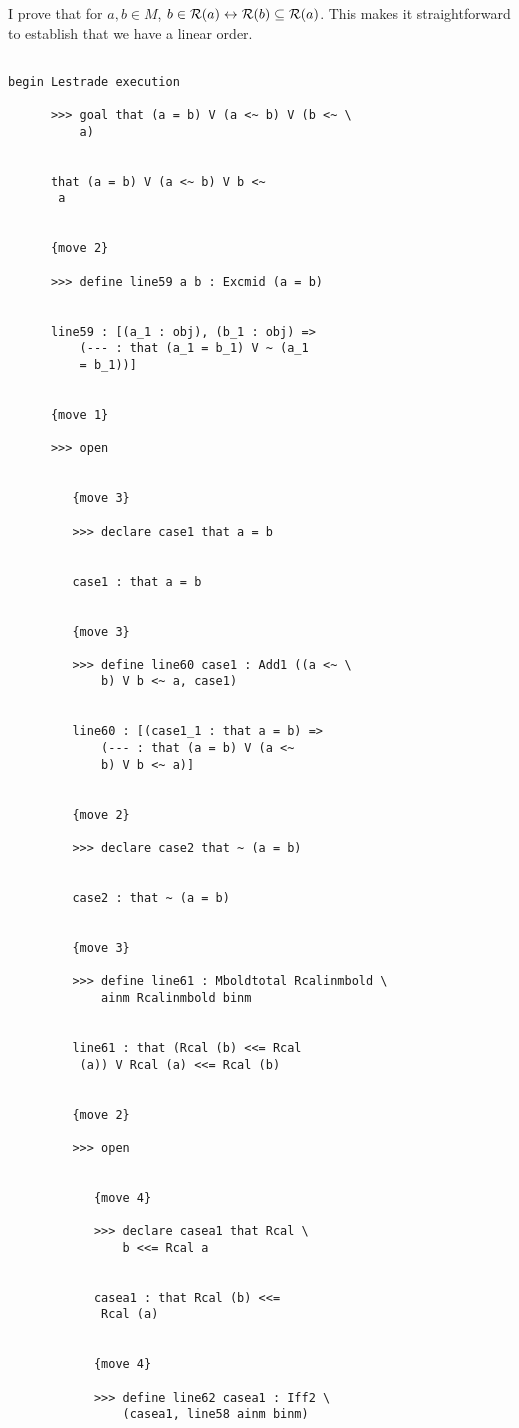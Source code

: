 \documentclass[12pt]{article}
\begin{document}
I prove that for $a,b \in M$, $b \in {\cal R}(a) \leftrightarrow {\cal R}(b) \subseteq {\cal R}(a)$.  This makes it straightforward to establish that we have a linear order.

\begin{verbatim}

begin Lestrade execution

      >>> goal that (a = b) V (a <~ b) V (b <~ \
          a)


      that (a = b) V (a <~ b) V b <~ 
       a


      {move 2}

      >>> define line59 a b : Excmid (a = b)


      line59 : [(a_1 : obj), (b_1 : obj) => 
          (--- : that (a_1 = b_1) V ~ (a_1 
          = b_1))]


      {move 1}

      >>> open


         {move 3}

         >>> declare case1 that a = b


         case1 : that a = b


         {move 3}

         >>> define line60 case1 : Add1 ((a <~ \
             b) V b <~ a, case1)


         line60 : [(case1_1 : that a = b) => 
             (--- : that (a = b) V (a <~ 
             b) V b <~ a)]


         {move 2}

         >>> declare case2 that ~ (a = b)


         case2 : that ~ (a = b)


         {move 3}

         >>> define line61 : Mboldtotal Rcalinmbold \
             ainm Rcalinmbold binm


         line61 : that (Rcal (b) <<= Rcal 
          (a)) V Rcal (a) <<= Rcal (b)


         {move 2}

         >>> open


            {move 4}

            >>> declare casea1 that Rcal \
                b <<= Rcal a


            casea1 : that Rcal (b) <<= 
             Rcal (a)


            {move 4}

            >>> define line62 casea1 : Iff2 \
                (casea1, line58 ainm binm)



\end{verbatim}
\end{document}
